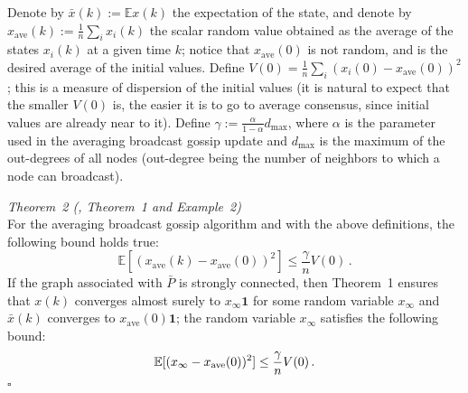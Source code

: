 \documentclass[oneside]{article}
\begin{document}
	 Denote by $\bar x(k) :=  \mathbb E x(k)$ the expectation of the state, and denote by $x_{\text{ave}}(k) := \frac{1}{n}\sum_i x_i(k)$ the scalar random value obtained as the average of the states $x_i(k)$ at a given time $k$; notice that $x_{\text{ave}}(0)$ is not random, and is the desired average of the initial values.
	 Define $V(0) = \frac{1}{n} \sum_i (x_i(0) - x_{\text{ave}}(0))^2 $; this is a measure of dispersion of the initial values (it is natural to expect that the smaller $V(0)$ is, the easier it is to go to average consensus, since initial values are already near to it). Define $\gamma:= \frac{\alpha}{1-\alpha} d_{\max}$,
	 where $\alpha$ is the parameter used in the averaging broadcast gossip update and $d_{\max}$ is the maximum of the out-degrees of all nodes (out-degree being the number of neighbors to which a node can broadcast).

	\textit{Theorem~2 (\cite{gossip-small-error}, Theorem~1 and Example~2)}\\
For the averaging broadcast gossip algorithm and with the above definitions, the following bound holds true:
\[ \mathbb E [ (x_{\text{ave}}(k) - x_{\text{ave}}(0))^2 ] \le
 \frac{\gamma}{n} V(0)  \, .\]
If the graph associated with $\bar P$ is strongly connected, then Theorem~1 ensures that
$x(k)$ converges almost surely to $x_{\infty} \mathbf 1$ for some random variable $x_{\infty}$ and $\bar x(k)$ converges to $x_{\text{ave}}(0) \mathbf 1$;  the random variable $x_{\infty}$ satisfies the following bound:
\[ \mathbb E [ (x_{\infty} - x_{\text{ave}}(0))^2 ] \le
\frac{\gamma}{n} V(0)\,. \vspace{-5mm}\]
\hfill $\square$
%
%
\end{document}
